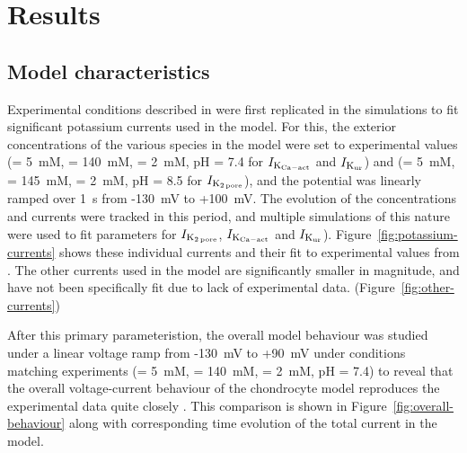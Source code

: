 \section*{Results}
\label{results}


\subsection*{Model characteristics}

Experimental conditions described in \citet{Clarketal2011} were first
replicated in the simulations to fit significant potassium currents
used in the model. For this, the exterior concentrations of the
various species in the model were set to experimental values (\Ko =
5~mM, \Nao = 140~mM, \Cao = 2~mM, pH = 7.4 for $I_{\rm K_{Ca-act}}$
and $I_{\rm K_{ur}}$) and (\Ko = 5~mM, \Nao = 145~mM, \Cao = 2~mM, pH
= 8.5 for $I_{\rm K_{2\, pore}}$), and the potential was linearly ramped
over 1~s from -130~mV to +100~mV. The evolution of the concentrations
and currents were tracked in this period, and multiple simulations
of this nature were used to fit parameters for $I_{\rm K_{2\, pore}}$,
$I_{\rm K_{Ca-act}}$ and $I_{\rm
  K_{ur}}$). Figure~\ref{fig:potassium-currents} shows these
individual currents and their fit to experimental values from
\citet{Clarketal2011}. The other currents used in the model are
significantly smaller in magnitude, and have not been specifically fit
due to lack of experimental data. (Figure~\ref{fig:other-currents})

After this primary parameteristion, the overall model behaviour was
studied under a linear voltage ramp from -130~mV to +90~mV under
conditions matching experiments (\Ko = 5~mM, \Nao = 140~mM, \Cao =
2~mM, pH = 7.4) to reveal that the overall voltage-current behaviour
of the chondrocyte model reproduces the experimental data quite
closely \citep{Clarketal2011}. This comparison is shown in
Figure~\ref{fig:overall-behaviour} along with corresponding time
evolution of the total current in the model.

